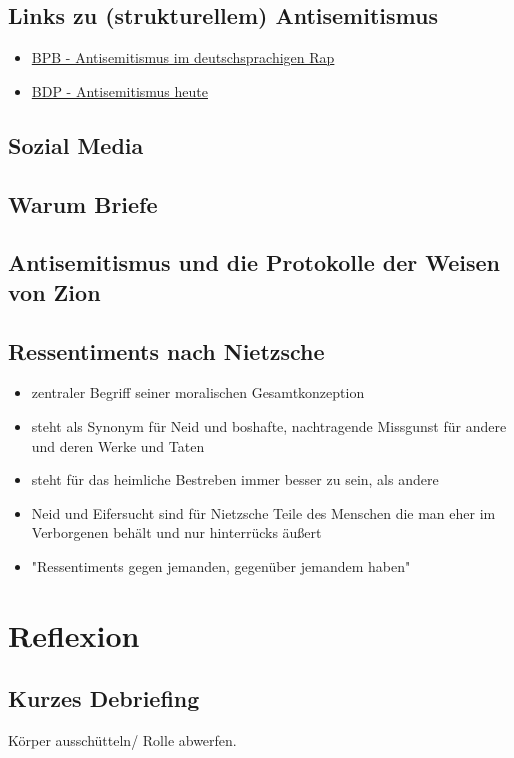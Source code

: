 \documentclass[12pt, a4paper, openany]{report}
\begin{document}
\section{Links zu (strukturellem) Antisemitismus}
\begin{itemize}
    \item \href{https://www.bpb.de/politik/extremismus/antisemitismus/285539/antisemitismus-im-deutschsprachigen-rap-und-pop}{BPB - Antisemitismus im deutschsprachigen Rap}
    \item \href{https://www.bpb.de/politik/extremismus/antisemitismus/37974/antisemitismus-heute}{BDP - Antisemitismus heute}
\end{itemize}

\section{Sozial Media}
\section{Warum Briefe}
\section{Antisemitismus und die Protokolle der Weisen von Zion}
\section{Ressentiments nach Nietzsche}
\begin{itemize}
    \item zentraler Begriff seiner moralischen Gesamtkonzeption
    \item steht als Synonym für Neid und boshafte, nachtragende Missgunst für andere und deren Werke und Taten
    \item steht für das heimliche Bestreben immer besser zu sein, als andere
    \item Neid und Eifersucht sind für Nietzsche Teile des Menschen die man eher im Verborgenen behält und nur hinterrücks äußert
    \item "Ressentiments gegen jemanden, gegenüber jemandem haben"
\end{itemize}

\chapter{Reflexion}
\section{Kurzes Debriefing}
Körper ausschütteln/ Rolle abwerfen.
\end{document}
